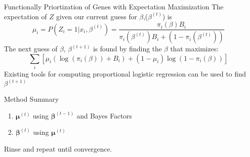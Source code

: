 \documentclass[bigger]{beamer}
\begin{document}
\begin{frame}{Functionally Priortization of Genes with Expectation Maximization}
  The expectation of $Z$ given our current guess for $\beta$,($\beta^{(t)}$) is  \[\mu_i=P(Z_i=1|x_i,\beta^{(t)})=\frac{\pi_i(\beta)B_i}{\pi_i(\beta^{(t)})B_i+(1-\pi_i(\beta^{(t)}))}\]
  \pause
  The next guess of $\beta$, $\beta^{(t+1)}$ is found by finding the $\beta$ that maximizes:
  \[\sum_i[\mu_i(\log(\pi_i(\beta))+B_i)+(1-\mu_i)\log(1-\pi_i(\beta))]\]
  Existing tools for computing proportional logistic regression can be used to find $\beta^{(t+1)}$ 
\end{frame}

\begin{frame}{Method Summary}
  \begin{enumerate}
  \item $\bm{\mu}^{(t)}$ using $\bm{\beta}^{(t-1)}$ and Bayes Factors
  \item  $\bm{\beta}^{(t)}$ using $\bm{\mu}^{(t)}$
  \end{enumerate}
  Rinse and repeat until convergence.
\end{frame}
  
\end{document}
